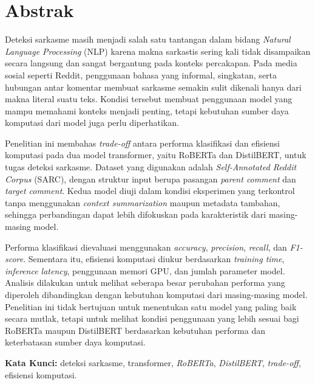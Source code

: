 \chapter*{Abstrak}

Deteksi sarkasme masih menjadi salah satu tantangan dalam bidang \textit{Natural Language Processing} (NLP) karena makna sarkastis sering kali tidak disampaikan secara langsung dan sangat bergantung pada konteks percakapan. Pada media sosial seperti Reddit, penggunaan bahasa yang informal, singkatan, serta hubungan antar komentar membuat sarkasme semakin sulit dikenali hanya dari makna literal suatu teks. Kondisi tersebut membuat penggunaan model yang mampu memahami konteks menjadi penting, tetapi kebutuhan sumber daya komputasi dari model juga perlu diperhatikan.

Penelitian ini membahas \textit{trade-off} antara performa klasifikasi dan efisiensi komputasi pada dua model transformer, yaitu RoBERTa dan DistilBERT, untuk tugas deteksi sarkasme. Dataset yang digunakan adalah \textit{Self-Annotated Reddit Corpus} (SARC), dengan struktur input berupa pasangan \textit{parent comment} dan \textit{target comment}. Kedua model diuji dalam kondisi eksperimen yang terkontrol tanpa menggunakan \textit{context summarization} maupun metadata tambahan, sehingga perbandingan dapat lebih difokuskan pada karakteristik dari masing-masing model.

Performa klasifikasi dievaluasi menggunakan \textit{accuracy}, \textit{precision}, \textit{recall}, dan \textit{F1-score}. Sementara itu, efisiensi komputasi diukur berdasarkan \textit{training time}, \textit{inference latency}, penggunaan memori GPU, dan jumlah parameter model. Analisis dilakukan untuk melihat seberapa besar perubahan performa yang diperoleh dibandingkan dengan kebutuhan komputasi dari masing-masing model. Penelitian ini tidak bertujuan untuk menentukan satu model yang paling baik secara mutlak, tetapi untuk melihat kondisi penggunaan yang lebih sesuai bagi RoBERTa maupun DistilBERT berdasarkan kebutuhan performa dan keterbatasan sumber daya komputasi.

\vspace{0.5 cm}

\begin{flushleft}
{\textbf{Kata Kunci:} deteksi sarkasme, transformer, \textit{RoBERTa}, \textit{DistilBERT}, \textit{trade-off}, efisiensi komputasi.}
\end{flushleft}